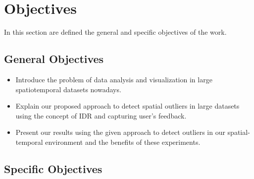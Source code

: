 

\section{Objectives}

In this section are defined the general and specific objectives of the work.

\subsection{General Objectives}

\begin{itemize}
	\item
	      Introduce the problem of data analysis and visualization in large spatiotemporal
	      datasets nowadays.
	\item
	      Explain our proposed approach to detect spatial outliers in large datasets using
	      the concept of IDR and capturing user's feedback.
	\item
	      Present our results using the given approach to detect outliers in our spatial-temporal
	      environment and the benefits of these experiments.

\end{itemize}

\subsection{Specific Objectives}

